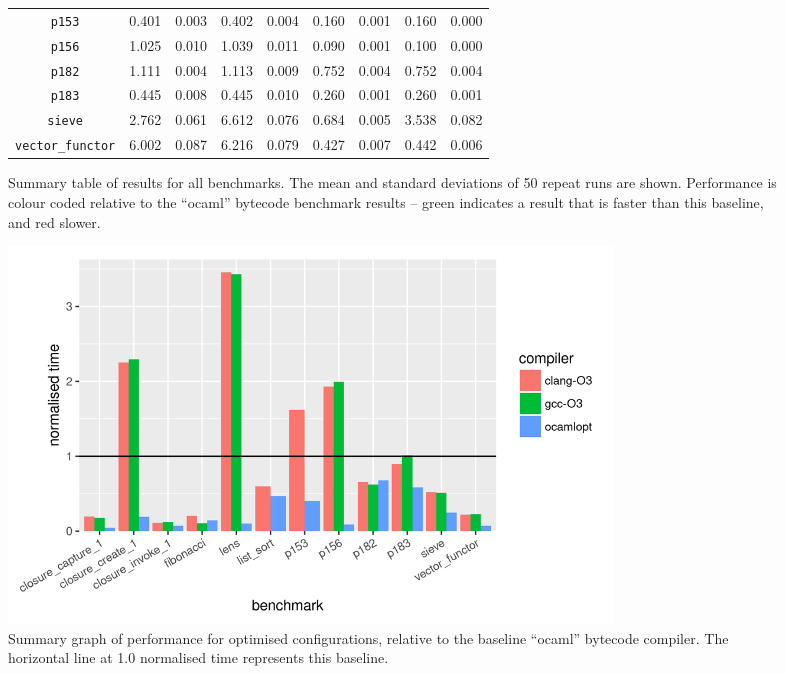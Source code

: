 \documentclass[12pt,a4paper,twoside,openright]{report}
\begin{document}
\begin{figure}[h]
\begin{tabular}{| c | c c | c c | c c | c c |}
\lstinline!p153!              & \cellcolor[hsb]{0.3,0.000,1}0.401 & 0.003 & \cellcolor[hsb]{0.0,0.001,1}0.402 & 0.004 & \cellcolor[hsb]{0.3,0.601,1}0.160 & 0.001 & \cellcolor[hsb]{0.3,0.601,1}0.160 & 0.000 \\
\lstinline!p156!              & \cellcolor[hsb]{0.3,0.000,1}1.025 & 0.010 & \cellcolor[hsb]{0.0,0.007,1}1.039 & 0.011 & \cellcolor[hsb]{0.3,0.912,1}0.090 & 0.001 & \cellcolor[hsb]{0.3,0.902,1}0.100 & 0.000 \\
\lstinline!p182!              & \cellcolor[hsb]{0.3,0.000,1}1.111 & 0.004 & \cellcolor[hsb]{0.0,0.000,1}1.113 & 0.009 & \cellcolor[hsb]{0.3,0.323,1}0.752 & 0.004 & \cellcolor[hsb]{0.3,0.323,1}0.752 & 0.004 \\
\lstinline!p183!              & \cellcolor[hsb]{0.3,0.000,1}0.445 & 0.008 & \cellcolor[hsb]{0.3,0.000,1}0.445 & 0.010 & \cellcolor[hsb]{0.3,0.416,1}0.260 & 0.001 & \cellcolor[hsb]{0.3,0.416,1}0.260 & 0.001 \\
\lstinline!sieve!             & \cellcolor[hsb]{0.3,0.000,1}2.762 & 0.061 & \cellcolor[hsb]{0.0,0.697,1}6.612 & 0.076 & \cellcolor[hsb]{0.3,0.752,1}0.684 & 0.005 & \cellcolor[hsb]{0.0,0.141,1}3.538 & 0.082 \\
\lstinline!vector_functor!    & \cellcolor[hsb]{0.3,0.000,1}6.002 & 0.087 & \cellcolor[hsb]{0.0,0.018,1}6.216 & 0.079 & \cellcolor[hsb]{0.3,0.929,1}0.427 & 0.007 & \cellcolor[hsb]{0.3,0.926,1}0.442 & 0.006 \\
\hline
\end{tabular}

\caption{Summary table of results for all benchmarks. The mean and standard deviations of 50 repeat runs are shown. Performance is colour coded relative to the ``ocaml'' bytecode benchmark results -- green indicates a result that is faster than this baseline, and red slower.}
\end{figure}

\begin{figure}
\centering
  \includegraphics[width=16cm]{resultsummary-b477d4580}

\caption{Summary graph of performance for optimised configurations, relative to
the baseline ``ocaml'' bytecode compiler. The horizontal line at 1.0 normalised
time represents this baseline.}\label{graph-summary}
\end{figure}
\end{document}
